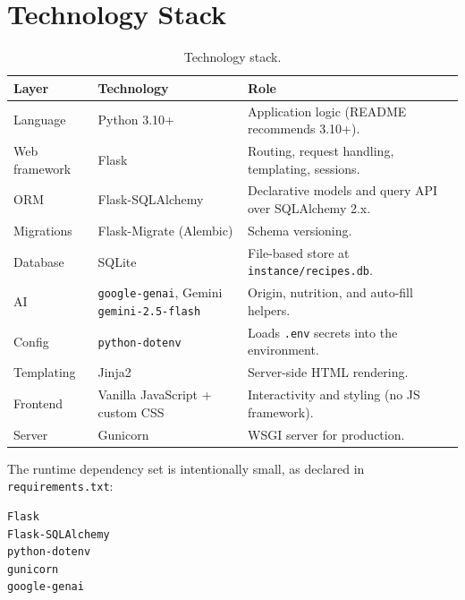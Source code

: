 \documentclass[11pt,a4paper]{article}
\newcommand{\code}[1]{\texttt{#1}}
\begin{document}
\section{Technology Stack}

\begin{table}[h]
\centering
\small
\begin{tabularx}{\textwidth}{@{}llX@{}}
\toprule
\textbf{Layer} & \textbf{Technology} & \textbf{Role} \\
\midrule
Language      & Python 3.10+            & Application logic (README recommends 3.10+). \\
Web framework & Flask                   & Routing, request handling, templating, sessions. \\
ORM           & Flask-SQLAlchemy        & Declarative models and query API over SQLAlchemy 2.x. \\
Migrations    & Flask-Migrate (Alembic) & Schema versioning. \\
Database      & SQLite                  & File-based store at \code{instance/recipes.db}. \\
AI            & \code{google-genai}, Gemini \code{gemini-2.5-flash} & Origin, nutrition, and auto-fill helpers. \\
Config        & \code{python-dotenv}    & Loads \code{.env} secrets into the environment. \\
Templating    & Jinja2                  & Server-side HTML rendering. \\
Frontend      & Vanilla JavaScript + custom CSS & Interactivity and styling (no JS framework). \\
Server        & Gunicorn                & WSGI server for production. \\
\bottomrule
\end{tabularx}
\caption{Technology stack.}
\end{table}

The runtime dependency set is intentionally small, as declared in
\code{requirements.txt}:

\begin{lstlisting}[style=txt,caption={requirements.txt}]
Flask
Flask-SQLAlchemy
python-dotenv
gunicorn
google-genai
\end{lstlisting}

\end{document}
